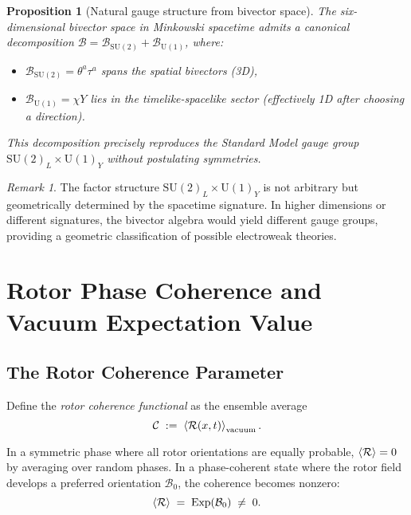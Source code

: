 \documentclass[11pt,a4paper]{article}
\newcommand{\Exp}{\operatorname{Exp}}
\newcommand{\Rotor}{\mathcal{R}}
\newcommand{\Biv}{\mathcal{B}}
\newcommand{\SU}{\mathrm{SU}}
\newcommand{\U}{\mathrm{U}}
\theoremstyle{definition}
\theoremstyle{plain}
\newtheorem{proposition}{Proposition}
\theoremstyle{remark}
\newtheorem{remark}{Remark}
\begin{document}
\begin{proposition}[Natural gauge structure from bivector space]
The six-dimensional bivector space in Minkowski spacetime admits a canonical decomposition $\Biv = \Biv_{\SU(2)} + \Biv_{\U(1)}$, where:
\begin{itemize}
  \item $\Biv_{\SU(2)} = \theta^a \tau^a$ spans the spatial bivectors (3D),
  \item $\Biv_{\U(1)} = \chi Y$ lies in the timelike-spacelike sector (effectively 1D after choosing a direction).
\end{itemize}
This decomposition precisely reproduces the Standard Model gauge group $\SU(2)_L \times \U(1)_Y$ without postulating symmetries.
\end{proposition}

\begin{remark}
The factor structure $\SU(2)_L \times \U(1)_Y$ is not arbitrary but geometrically determined by the spacetime signature. In higher dimensions or different signatures, the bivector algebra would yield different gauge groups, providing a geometric classification of possible electroweak theories.
\end{remark}

\vspace{1em}

\section{Rotor Phase Coherence and Vacuum Expectation Value}\label{sec:coherence-vev}

\subsection{The Rotor Coherence Parameter}

Define the \emph{rotor coherence functional} as the ensemble average
\begin{equation}
  \mathcal{C} \;:=\; \ev{\Rotor(x,t)}_{\text{vacuum}}.
  \label{eq:coherence}
\end{equation}

In a symmetric phase where all rotor orientations are equally probable, $\ev{\Rotor} = 0$ by averaging over random phases. In a phase-coherent state where the rotor field develops a preferred orientation $\Biv_0$, the coherence becomes nonzero:
\begin{equation}
  \ev{\Rotor} \;=\; \Exp(\Biv_0) \;\neq\; 0.
\end{equation}
\end{document}
